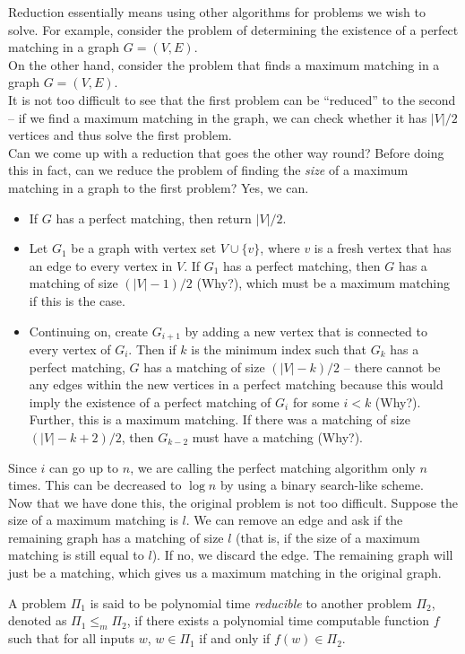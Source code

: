 	Reduction essentially means using other algorithms for problems we wish to solve. For example, consider the problem of determining the existence of a perfect matching in a graph $G=(V,E)$.\\
	On the other hand, consider the problem that finds a maximum matching in a graph $G=(V,E)$.\\
	It is not too difficult to see that the first problem can be ``reduced'' to the second -- if we find a maximum matching in the graph, we can check whether it has $|V|/2$ vertices and thus solve the first problem.\\
	Can we come up with a reduction that goes the other way round? Before doing this in fact, can we reduce the problem of finding the \textit{size} of a maximum matching in a graph to the first problem? Yes, we can.
	\begin{itemize}
		\item If $G$ has a perfect matching, then return $|V|/2$.
		\item Let $G_1$ be a graph with vertex set $V\cup\{v\}$, where $v$ is a fresh vertex that has an edge to every vertex in $V$. If $G_1$ has a perfect matching, then $G$ has a matching of size $(|V|-1)/2$ (Why?), which must be a maximum matching if this is the case.
		\item Continuing on, create $G_{i+1}$ by adding a new vertex that is connected to every vertex of $G_{i}$. Then if $k$ is the minimum index such that $G_k$ has a perfect matching, $G$ has a matching of size $(|V|-k)/2$ -- there cannot be any edges within the new vertices in a perfect matching because this would imply the existence of a perfect matching of $G_i$ for some $i<k$ (Why?). Further, this is a maximum matching. If there was a matching of size $(|V|-k+2)/2$, then $G_{k-2}$ must have a matching (Why?).
	\end{itemize}
	Since $i$ can go up to $n$, we are calling the perfect matching algorithm only $n$ times. This can be decreased to $\log n$ by using a binary search-like scheme.\\
	Now that we have done this, the original problem is not too difficult. Suppose the size of a maximum matching is $l$. We can remove an edge and ask if the remaining graph has a matching of size $l$ (that is, if the size of a maximum matching is still equal to $l$). If no, we discard the edge. The remaining graph will just be a matching, which gives us a maximum matching in the original graph.\\

	\begin{definition}[Reduction]
		A problem $\mathsf{\Pi}_1$ is said to be polynomial time \textit{reducible} to another problem $\mathsf{\Pi}_2$, denoted as $\mathsf{\Pi}_1 \leq_m \mathsf{\Pi}_2$, if there exists a polynomial time computable function $f$ such that for all inputs $w$, $w\in\mathsf{\Pi}_1$ if and only if $f(w)\in\mathsf{\Pi}_2$.
	\end{definition}

